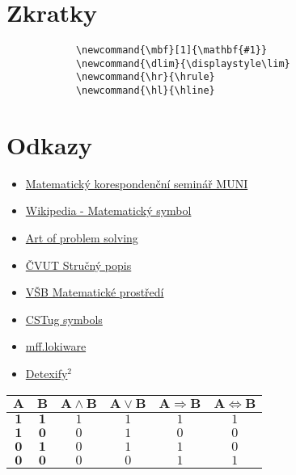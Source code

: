 \documentclass{article}
\newcommand{\hl}{\hline}
\newcommand{\dlim}{\displaystyle\lim}
\newcommand{\mbf}[1]{\mathbf{#1}}
\begin{document}
\begin{multicols}{2}
	\columnbreak

		\section*{Zkratky}
		\begin{verbatim}
			\newcommand{\mbf}[1]{\mathbf{#1}}
			\newcommand{\dlim}{\displaystyle\lim}
			\newcommand{\hr}{\hrule}
			\newcommand{\hl}{\hline}
		\end{verbatim}

		\section*{Odkazy}
		\begin{itemize}
			\item \href{http://mks.mff.cuni.cz/info/tex/psani.php}{Matematický korespondenční seminář MUNI}
			\item \href{http://cs.wikipedia.org/wiki/Matematický_symbol}{Wikipedia - Matematický symbol}
			\item \href{http://www.artofproblemsolving.com/Wiki/index.php/LaTeX:Symbols}{Art of problem solving}
			\item \href{http://mat.fsv.cvut.cz/konickova/navody/ltxstruc.pdf}{ČVUT Stručný popis}
			\item \href{http://www.cs.vsb.cz/benes/vyuka/latex/math.htm}{VŠB Matematické prostředí}
			\item \href{http://ftp.cstug.cz/pub/tex/CTAN/info/symbols/comprehensive/symbols-letter.pdf}{CSTug symbols}
			\item \href{http://mff.lokiware.info/LaTeX}{mff.lokiware}
			\item \href{http://detexify.kirelabs.org/classify.html}{Detexify$^2$}
		\end{itemize}

		\begin{tabular}{cc|cccc}
				$\mbf{A}$	&	$\mbf{B}$	&	$\mbf{A \wedge B}$	&	$\mbf{A \vee B}$	&	$\mbf{A \Rightarrow B}$	&	$\mbf{A \Leftrightarrow B}$	\\\hline
				$\mbf{1}$	&	$\mbf{1}$	&	$1$									&	$1$								&	$1$											&	$1$													\\
				$\mbf{1}$	&	$\mbf{0}$	&	$0$									&	$1$								&	$0$											&	$0$													\\
				$\mbf{0}$	&	$\mbf{1}$	&	$0$									&	$1$								&	$1$											&	$0$													\\
				$\mbf{0}$	&	$\mbf{0}$	&	$0$									&	$0$								&	$1$											&	$1$													\\
			\end{tabular}

	\end{multicols}
\end{document}
